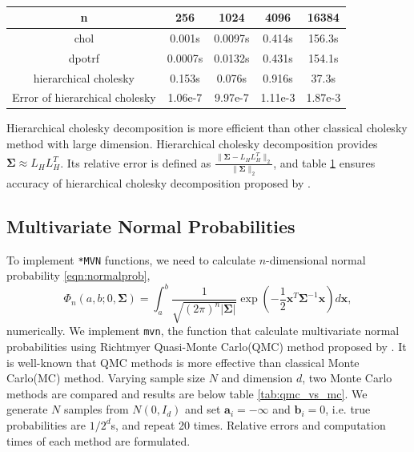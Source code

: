 \begin{table}[ht]
	\centering
	{
		\begin{tabular}{@{}ccccc@{}}
			\toprule
			n & 256 & 1024 & 4096 & 16384 \\ \midrule
			chol & 0.001s & 0.0097s & 0.414s & 156.3s \\
			dpotrf & 0.0007s & 0.0132s & 0.431s & 154.1s \\
			hierarchical cholesky & 0.153s & 0.076s & 0.916s & 37.3s \\
			Error of hierarchical cholesky & 1.06e-7 & 9.97e-7 & 1.11e-3 & 1.87e-3 \\  \bottomrule
		\end{tabular}%
	}
	\caption{}
	\label{tab:table1}
\end{table}
Hierarchical cholesky decomposition is more efficient than other classical cholesky method with large dimension. Hierarchical cholesky decomposition provides $\boldsymbol{\Sigma}\approx L_HL_H^T$. Its relative error is defined as $\frac{\lVert\boldsymbol{\Sigma}-L_HL_H^T\rVert_2}{\lVert\boldsymbol{\Sigma}\rVert_2}$, and table \ref{tab:table1} ensures accuracy of hierarchical cholesky decomposition proposed by \citet{hackbusch2015hierarchical}.


\subsection{Multivariate Normal Probabilities} 

To implement \texttt{*MVN} functions, we need to calculate $n$-dimensional normal probability \eqref{eqn:normalprob},
$$
\Phi_n(a, b; 0, \boldsymbol{\Sigma}) = \int_a^b \frac{1}{\sqrt{(2\pi)^n |\boldsymbol{\Sigma}|}} \exp\left( -\frac{1}{2} \mathbf{x}^T \boldsymbol{\Sigma}^{-1} \mathbf{x} \right) d\mathbf{x},
$$ 
numerically. We implement \texttt{mvn}, the function that calculate multivariate normal probabilities using Richtmyer Quasi-Monte Carlo(QMC) method proposed by \citet{genz2009computation}. It is well-known that QMC methods is more effective than classical Monte Carlo(MC) method. Varying sample size $N$ and dimension $d$, two Monte Carlo methods are compared and results are below table \ref{tab:qmc_vs_mc}. We generate $N$ samples from $N(0, I_d)$ and set $\mathbf{a}_i = -\infty$ and $\mathbf{b}_i = 0$, i.e. true probabilities are $1/2^d$s, and repeat 20 times. Relative errors and computation times of each method are formulated.

